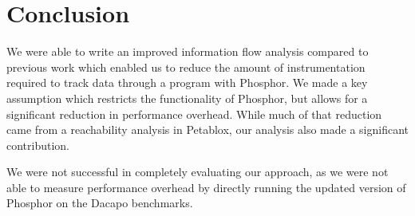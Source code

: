 \chapter{Conclusion}
We were able to write an improved information flow analysis compared
to previous work which enabled us to reduce the amount of
instrumentation required to track data through a program with
Phosphor. We made a key assumption which restricts the functionality
of Phosphor, but allows for a significant reduction in performance
overhead. While much of that reduction came from a reachability
analysis in Petablox, our analysis also made a significant
contribution.

We were not successful in completely evaluating our approach, as we
were not able to measure performance overhead by directly running the
updated version of Phosphor on the Dacapo benchmarks.
